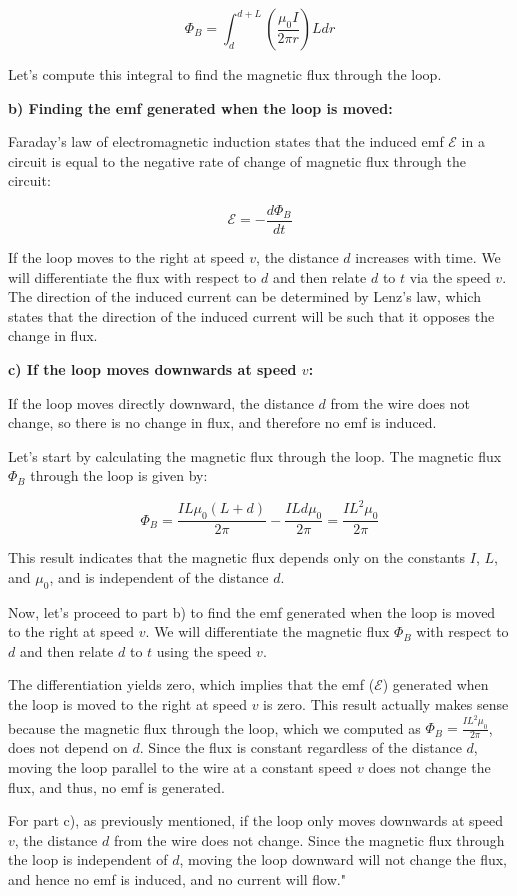 \[
\Phi_B = \int_{d}^{d+L} \left(\frac{\mu_0 I}{2\pi r}\right) L dr
\]

Let's compute this integral to find the magnetic flux through the loop.

\textbf{b) Finding the emf generated when the loop is moved:}

Faraday's law of electromagnetic induction states that the induced emf $\mathcal{E}$ in a circuit is equal to the negative rate of change of magnetic flux through the circuit:

\[
\mathcal{E} = - \frac{d\Phi_B}{dt}
\]

If the loop moves to the right at speed $v$, the distance $d$ increases with time. We will differentiate the flux with respect to $d$ and then relate $d$ to $t$ via the speed $v$. The direction of the induced current can be determined by Lenz's law, which states that the direction of the induced current will be such that it opposes the change in flux.

\textbf{c) If the loop moves downwards at speed $v$:}

If the loop moves directly downward, the distance $d$ from the wire does not change, so there is no change in flux, and therefore no emf is induced.

Let's start by calculating the magnetic flux through the loop. The magnetic flux $\Phi_B$ through the loop is given by:

\[
\Phi_B = \frac{I L \mu_0 (L + d)}{2 \pi} - \frac{I L d \mu_0}{2 \pi} = \frac{I L^2 \mu_0}{2 \pi}
\]

This result indicates that the magnetic flux depends only on the constants $I$, $L$, and $\mu_0$, and is independent of the distance $d$.

Now, let's proceed to part b) to find the emf generated when the loop is moved to the right at speed $v$. We will differentiate the magnetic flux $\Phi_B$ with respect to $d$ and then relate $d$ to $t$ using the speed $v$.

The differentiation yields zero, which implies that the emf ($\mathcal{E}$) generated when the loop is moved to the right at speed $v$ is zero. This result actually makes sense because the magnetic flux through the loop, which we computed as $\Phi_B = \frac{I L^2 \mu_0}{2 \pi}$, does not depend on $d$. Since the flux is constant regardless of the distance $d$, moving the loop parallel to the wire at a constant speed $v$ does not change the flux, and thus, no emf is generated.

For part c), as previously mentioned, if the loop only moves downwards at speed $v$, the distance $d$ from the wire does not change. Since the magnetic flux through the loop is independent of $d$, moving the loop downward will not change the flux, and hence no emf is induced, and no current will flow."

